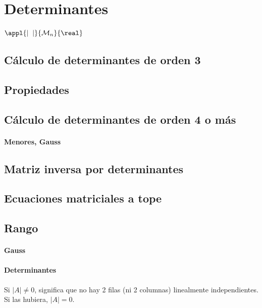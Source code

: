 \section{Determinantes}

\begin{defn}[Determinante]
$\appl{|\;\;|}{\mathcal{M}_n}{\real}$
\end{defn}

\subsection{Cálculo de determinantes de orden 3}

\subsection{Propiedades}

\subsection{Cálculo de determinantes de orden 4 o más}

\paragraph{Menores, Gauss}

\subsection{Matriz inversa por determinantes}

\subsection{Ecuaciones matriciales a tope}

\subsection{Rango}
\paragraph{Gauss}

\paragraph{Determinantes}

Si $|A| \neq 0$, significa que no hay 2 filas (ni 2 columnas) linealmente independientes. Si las hubiera, $|A| = 0$.

